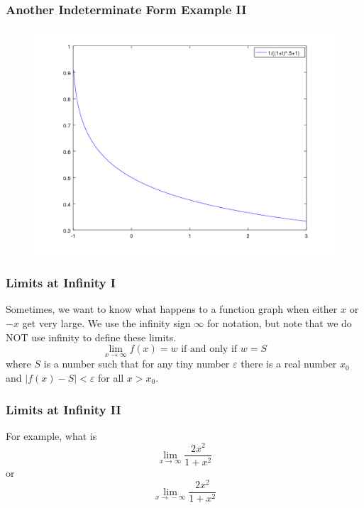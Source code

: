 \documentclass[xcolor=dvipsnames]{beamer}
\begin{document}
\begin{frame}
  \frametitle{Another Indeterminate Form Example II}
  \begin{figure}[h]
    \includegraphics[scale=.5]{./indeterminate.png}
  \end{figure}
\end{frame}

\begin{frame}
  \frametitle{Limits at Infinity I}
Sometimes, we want to know what happens to a function graph when
either $x$ or $-x$ get very large. We use the infinity sign $\infty$
for notation, but note that we do NOT use infinity to define these
limits. 
\begin{equation}
  \label{eq:xetieshe}
  \lim_{x\rightarrow{}\infty}f(x)=w\mbox{ if and only if }w=S
\end{equation}
where $S$ is a number such that for any tiny number $\varepsilon$
there is a real number $x_{0}$ and
$\vert{}f(x)-S\vert<\varepsilon$ for all $x>x_{0}$.
\end{frame}

\begin{frame}
  \frametitle{Limits at Infinity II}
For example, what is
\begin{equation}
  \label{eq:wingeisa}
  \lim_{x\rightarrow\infty}\frac{2x^{2}}{1+x^{2}}
\end{equation}
or
\begin{equation}
  \label{eq:ahxaibah}
  \lim_{x\rightarrow{}-\infty}\frac{2x^{2}}{1+x^{2}}
\end{equation}
\end{frame}
\end{document}
